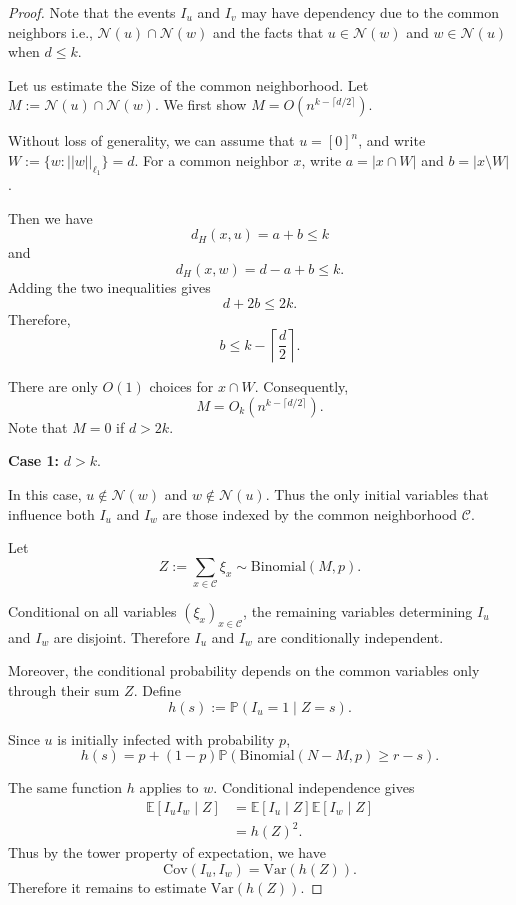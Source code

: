 \documentclass[10pt,a4paper]{amsart}
\renewcommand{\ge}{\geqslant}
\renewcommand{\le}{\leqslant}
\begin{document}
\begin{proof}
Note that the events $I_u$ and $I_v$ may have dependency due to the common neighbors i.e., $\mathcal{N}(u)\cap \mathcal{N}(w)$ and the facts that $u\in \mathcal{N}(w)$ and $w\in \mathcal{N}(u)$ when $d\le k$.

Let us estimate the Size of the common neighborhood. Let $M:=\mathcal{N}(u)\cap \mathcal{N}(w)$. We first show $M=O\left(n^{k-\lceil d/2\rceil}\right)$.

Without loss of generality, we can assume that $u=[0]^n$, and write  $W:=\{w:||w||_{\ell_1}\}=d$. For a common neighbor $x$, write $a=|x\cap W|$ and $b=|x\setminus W|$.

Then we have 
$$d_H(x,u)=a+b\le k $$
and
$$d_H(x,w)=d-a+b\le k.$$
Adding the two inequalities gives
$$d+2b\le 2k.$$
Therefore,
$$b\le k-\left\lceil\frac d2\right\rceil.$$

There are only $O(1)$ choices for $x\cap W$. Consequently,
$$
M = O_k\left( n^{k-\lceil d/2\rceil}\right).
$$
Note that $M=0$ if $d>2k$.

\textbf{Case 1:} $d >k$.

In this case, $u\notin \mathcal{N}(w)$ and $w\notin \mathcal{N}(u)$. Thus the only initial variables that influence both $I_u$ and $I_w$ are those indexed by the common neighborhood $\mathcal C$.

Let
$$ Z:=\sum_{x\in\mathcal C}\xi_x \sim \text{Binomial}(M,p).
$$

Conditional on all variables $(\xi_x)_{x\in\mathcal C}$, the remaining variables determining $I_u$ and $I_w$ are disjoint. Therefore $I_u$ and $I_w$ are conditionally independent.

Moreover, the conditional probability depends on the common variables only through their sum $Z$. Define
$$
h(s):= \mathbb{P}(I_u=1\mid Z=s).
$$

Since $u$ is initially infected with probability $p$,
$$h(s)= p+(1-p) \mathbb P\left( \text{Binomial}(N-M,p)\ge r-s
\right). $$



The same function $h$ applies to $w$. Conditional independence gives
\begin{align*}
\mathbb{E}[I_uI_w\mid Z]
&= \mathbb{E}[I_u\mid Z]\mathbb{E}[I_w\mid Z] \\
&= h(Z)^2.
\end{align*}
Thus by the tower property of expectation, we have 
$$\text{Cov}(I_u,I_w) =\text{Var}(h(Z)).$$
Therefore it remains to estimate $\text{Var}(h(Z))$.


\end{proof}
\end{document}
